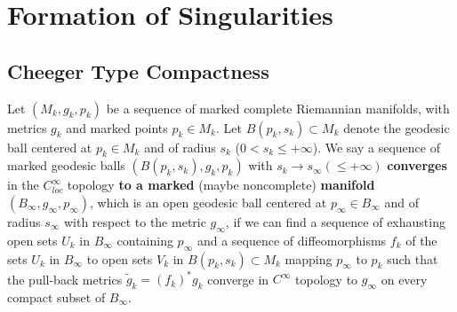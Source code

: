 \chapter{Formation of Singularities}
\label{chap:cz-singularity-formation}
\section{Cheeger Type Compactness}
\begin{definition}
  \label{def:cz-pointed-smooth-convergence-of-riemannian-manifolds}
Let $(M_k,g_k,p_k)$ be a sequence of marked complete Riemannian
manifolds, with metrics $g_k$ and marked points $p_k\in M_k$. Let
$B(p_k, s_k)\subset M_k$ denote the geodesic ball centered at
$p_k\in M_k$ and of radius $s_k$ ($0 < s_k \leq +\infty$). We say
a sequence of marked geodesic balls $(B(p_k,s_k),g_k, p_k)$ with
$s_k \rightarrow s_{\infty}(\leq +\infty)$ {\bf converges} in the
$C_{loc}^{\infty}$ topology {\bf to a marked} (maybe noncomplete)
{\bf manifold}
$(B_{\infty},g_{\infty},p_{\infty})$, which is an open geodesic
ball centered at $p_{\infty}\in B_{\infty}$ and of radius
$s_{\infty}$ with respect to the metric $g_{\infty}$, if we can
find a sequence of exhausting open sets $U_k$ in $B_{\infty}$
containing $p_{\infty}$ and a sequence of diffeomorphisms $f_k$ of
the sets $U_k$ in $B_{\infty}$ to open sets $V_k$ in $B(p_k,s_k)
\subset M_k$ mapping $p_{\infty}$ to $p_k$ such that the pull-back
metrics $\tilde{g}_k=(f_k)^*g_k$ converge in $C^\infty$ topology
to $g_{\infty}$ on every compact subset of $B_{\infty}$.
\end{definition}
